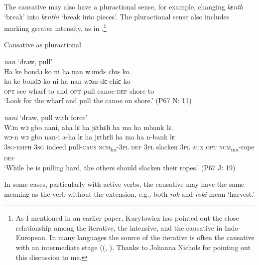 The causative may also have a pluractional sense, for example, changing \textit{kɛnth} ‘break' into \textit{kɛnthi} ‘break into pieces'. The pluractional sense also includes marking greater intensity, as in .\footnote{As I mentioned in an earlier paper, Kuryłowicz has pointed out the close relationship among the iterative, the intensive, and the causative in Indo-European. In many languages the source of the iterative is often the causative with an intermediate stage ((\citealt[91, fn3]{Childs1987}, \citealt[86f]{Kuryłowicz1964}). Thanks to Johanna Nichols for pointing out this discussion to me.}



\ea%
    \label{ex:159}Causative as pluractional
    
    \ea 
    \label{ex:159a} \textit{nan} ‘draw, pull'\\

    Ha  ke bondɔ ko ni ha nan wɔmdɛ chiɛ ko.\\
    \gll ha    ke    bondɔ  ko    ni    ha    nan  wɔm-dɛ    chiɛ  ko\\
    \textsc{opt}  see  wharf    to    and  \textsc{opt}  pull  canoe{}-\textsc{def}  shore  to\\
  \glt ‘Look for the wharf and pull the canoe on shore.' (P67 N: 11)\\
  \vspace{6pt}

  \ex
  \label{ex:159b} \textit{nani} ‘draw, pull with force'\\
  
    Wɔn wɔ gbo nani, aha lɛ ha jɛthɛli ha ma ha mbank lɛ.\\
  \gll wɔ{}-n      wɔ    gbo    nan-i    a-ha      lɛ     ha    jɛthɛli\footnotemark{}    ha    ma   ha  n-bank      lɛ\\
  \textsc{3sg-emph}  \textsc{3sg}  indeed  pull-\textsc{caus}  \textsc{ncm}\textsubscript{ha}{}-3\textsc{pl}  \textsc{def}    \textsc{3pl}    slacken    \textsc{3pl}  \textsc{aux} \textsc{opt} \textsc{ncm}\textsubscript{ma}{}-rope    \textsc{def}\\
  \glt ‘While he is pulling hard, the others should slacken their ropes.' (P67 J: 19)
\z
\z
 
In some cases, particularly with active verbs, the causative may have the same meaning as the verb without the extension, e.g., both \textit{rok} and \textit{roki} mean ‘harvest.'

